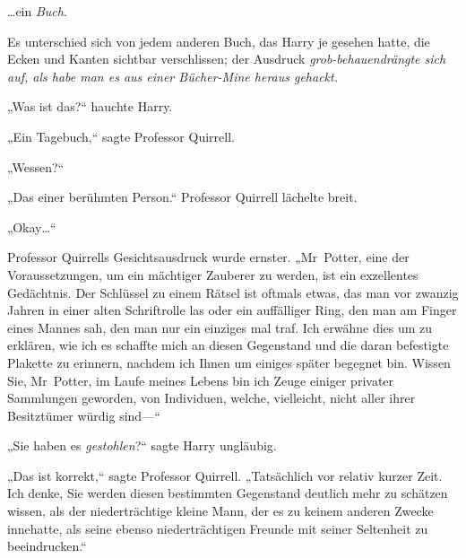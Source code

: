 {%
…ein \emph{Buch}.

Es unterschied sich von jedem anderen Buch, das Harry je gesehen hatte, die Ecken und Kanten sichtbar verschlissen; der Ausdruck \emph{grob-behauendrängte sich auf, als habe man es aus einer Bücher-Mine heraus gehackt.}

„Was ist das?“ hauchte Harry.

„Ein Tagebuch,“ sagte Professor Quirrell.

„Wessen?“

„Das einer berühmten Person.“ Professor Quirrell lächelte breit.

„Okay…“

Professor Quirrells Gesichtsausdruck wurde ernster. „Mr~Potter, eine der Voraussetzungen, um ein mächtiger Zauberer zu werden, ist ein exzellentes Gedächtnis. Der Schlüssel zu einem Rätsel ist oftmals etwas, das man vor zwanzig Jahren in einer alten Schriftrolle las oder ein auffälliger Ring, den man am Finger eines Mannes sah, den man nur ein einziges mal traf. Ich erwähne dies um zu erklären, wie ich es schaffte mich an diesen Gegenstand und die daran befestigte Plakette zu erinnern, nachdem ich Ihnen um einiges später begegnet bin. Wissen Sie, Mr~Potter, im Laufe meines Lebens bin ich Zeuge einiger privater Sammlungen geworden, von Individuen, welche, vielleicht, nicht aller ihrer Besitztümer würdig sind—“

„Sie haben es \emph{gestohlen}?“ sagte Harry ungläubig.

„Das ist korrekt,“ sagte Professor Quirrell. „Tatsächlich vor relativ kurzer Zeit. Ich denke, Sie werden diesen bestimmten Gegenstand deutlich mehr zu schätzen wissen, als der niederträchtige kleine Mann, der es zu keinem anderen Zwecke innehatte, als seine ebenso niederträchtigen Freunde mit seiner Seltenheit zu beeindrucken.“

}
